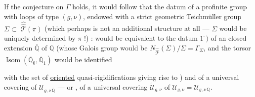 If the conjecture on $\Gamma$ holds, it would follow that the datum of a  profinite group with loops \inserted{$\pi$} of type $(g,\nu)$, endowed with a strict geometric Teichmüller group $\Sigma\subset$ $\widehat{\widehat{\mathcal T}}(\pi)$ (which perhaps is not an additional structure at all --- $\Sigma$ would be uniquely determined by $\pi$ !) : would be equivalent to the datum $1^{\circ})$ of an  closed extension $\overline{\mathbb Q}$ of $\mathbb Q$ (whose Galois group would be $N_{\widehat{\widehat{\mathcal T}}}(\Sigma)/\Sigma=\Gamma_\Sigma$, and the torsor $\operatorname{Isom}(\overline{\mathbb Q}_0,\overline{\mathbb Q}_1)$ would be identified


with the set  of  \uline{oriented} quasi-rigidifications giving rise to ) and of a universal covering of $\mathcal U_{g,\nu\,\overline{\mathbb Q}}$ --- or , of a universal covering $\widetilde{\mathcal U}_{g,\nu}$ of $\mathcal U_{g,\nu}=\mathcal U_{g,\nu\,\mathbb Q}$.


